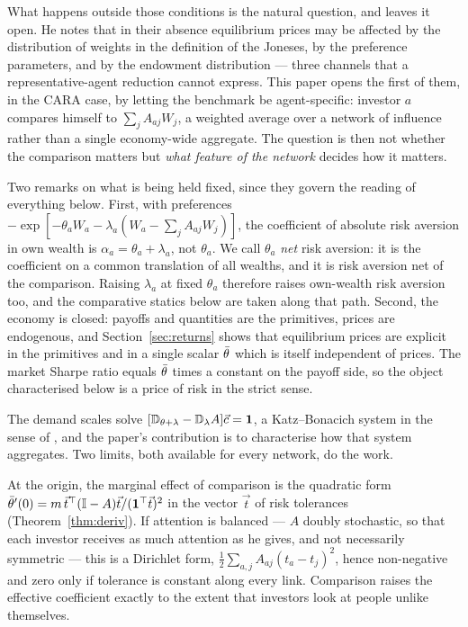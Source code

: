 What happens outside those conditions is the natural question, and \cite{gomez}
leaves it open. He notes that in their absence equilibrium prices may be
affected by the distribution of weights in the definition of the Joneses, by the
preference parameters, and by the endowment distribution --- three channels that
a representative-agent reduction cannot express. This paper opens the first of
them, in the CARA case, by letting the benchmark be agent-specific: investor $a$
compares himself to $\sum_jA_{aj}W_j$, a weighted average over a network of
influence rather than a single economy-wide aggregate. The question is then not
whether the comparison matters but \emph{what feature of the network} decides
how it matters.

Two remarks on what is being held fixed, since they govern the reading of
everything below. First, with preferences
$-\exp[-\theta_aW_a-\lambda_a(W_a-\sum_jA_{aj}W_j)]$, the coefficient of
absolute risk aversion in own wealth is $\alpha_a=\theta_a+\lambda_a$, not
$\theta_a$. We call $\theta_a$ \emph{net} risk aversion: it is the coefficient
on a common translation of all wealths, and it is risk aversion net of the
comparison. Raising $\lambda_a$ at fixed $\theta_a$ therefore raises own-wealth
risk aversion too, and the comparative statics below are taken along that path.
Second, the economy is closed: payoffs and quantities are the primitives,
prices are endogenous, and Section~\ref{sec:returns} shows that equilibrium
prices are explicit in the primitives and in a single scalar $\bar\theta$ which is
itself independent of prices. The market Sharpe ratio equals $\bar\theta$ times a
constant on the payoff side, so the object characterised below is a price of
risk in the strict sense.

The demand scales solve $[\mathbb{D}_{\theta+\lambda}-\mathbb{D}_{\lambda}A]\vec c=\mathbf 1$, a
Katz--Bonacich system in the sense of \cite{ballester}, and the paper's
contribution is to characterise how that system aggregates. Two limits, both
available for every network, do the work.

At the origin, the marginal effect of comparison is the quadratic form
$\bar\theta'(0)=m\,\vec t^{\top}(\mathbb{I}-A)\vec t/(\mathbf 1^{\top}\vec t)^{2}$ in
the vector $\vec t$ of risk tolerances (Theorem~\ref{thm:deriv}). If attention
is balanced --- $A$ doubly stochastic, so that each investor receives as much
attention as he gives, and not necessarily symmetric --- this is a Dirichlet
form, $\tfrac12\sum_{a,j}A_{aj}(t_a-t_j)^{2}$, hence non-negative and zero only
if tolerance is constant along every link. Comparison raises the effective
coefficient exactly to the extent that investors look at people unlike
themselves.

